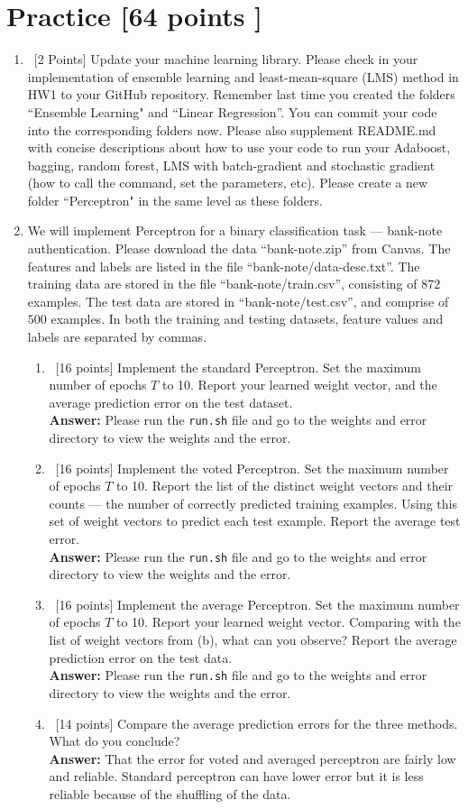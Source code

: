 \documentclass[12pt, fullpage,letterpaper]{article}
\newcommand{\Answer}{{\\\textbf{Answer: }}}
\begin{document}
\section{Practice [64 points ]}
\begin{enumerate}
	\item~[2 Points] Update your machine learning library. Please check in your implementation of ensemble learning and least-mean-square (LMS) method in HW1 to your GitHub repository. Remember last time you created the folders ``Ensemble Learning" and ``Linear Regression''. You can commit your code into the corresponding folders now. Please also supplement README.md with concise descriptions about how to use your code to run your Adaboost, bagging, random forest, LMS with batch-gradient and stochastic gradient (how to call the command, set the parameters, etc). Please create a new folder ``Perceptron" in the same level as these folders.  

\item We will implement  Perceptron for a binary classification task --- bank-note authentication. Please download the data ``bank-note.zip'' from Canvas. The features and labels are listed in the file ``bank-note/data-desc.txt''. The training data are stored in the file ``bank-note/train.csv'', consisting of $872$ examples. The test data are stored in ``bank-note/test.csv'', and comprise of $500$ examples. In both the training and testing datasets, feature values and labels are separated by commas. 
\begin{enumerate}
	\item~[16 points] Implement the standard Perceptron. Set the maximum number of epochs $T$ to 10. Report your learned weight vector, and the average prediction error on the test dataset. 
	\Answer Please run the {\tt run.sh} file and go to the weights and error directory to view the weights and the error.
	\item~[16 points] Implement the voted Perceptron. Set the maximum number of epochs $T$ to 10. Report the list of the distinct weight vectors and their counts --- the number of correctly predicted training examples. Using this set of weight vectors to predict each test example. Report the average test error. 
	\Answer Please run the {\tt run.sh} file and go to the weights and error directory to view the weights and the error.
	\item~[16 points] Implement the average Perceptron. Set the maximum number of epochs $T$ to 10. Report your learned weight vector. Comparing with the list of weight vectors from (b), what can you observe? Report the average prediction error on the test data. 
	\Answer Please run the {\tt run.sh} file and go to the weights and error directory to view the weights and the error.
	\item~[14 points] Compare the average prediction errors for the three methods. What do you conclude? 
	\Answer
	That the error for voted and averaged perceptron are fairly low and reliable.  Standard perceptron can have lower error but it is less reliable because of the shuffling of the data.
\end{enumerate}


\end{enumerate}
\end{document}
